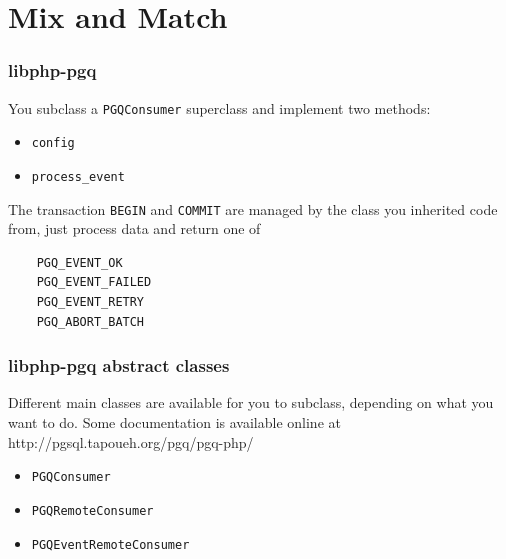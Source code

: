 \documentclass{beamer}
\begin{document}
\section{Mix and Match}


\begin{frame}[fragile]
  \frametitle{libphp-pgq}

  You subclass a \texttt{PGQConsumer} superclass and implement two methods:
  \begin{itemize}
   \item \texttt{config}
   \item \texttt{process\_event}
  \end{itemize}

  \pause

  The transaction \texttt{BEGIN} and \texttt{COMMIT} are managed by the
  class you inherited code from, just process data and return one of

  \begin{verbatim}
    PGQ_EVENT_OK
    PGQ_EVENT_FAILED
    PGQ_EVENT_RETRY
    PGQ_ABORT_BATCH
  \end{verbatim}
\end{frame}

\begin{frame}[fragile]
  \frametitle{libphp-pgq abstract classes}

  Different main classes are available for you to subclass, depending on
  what you want to do. Some documentation is available online at
  http://pgsql.tapoueh.org/pgq/pgq-php/

  \begin{itemize}
   \item<2-> \texttt{PGQConsumer}
   \item<3-> \texttt{PGQRemoteConsumer}
   \item<4-> \texttt{PGQEventRemoteConsumer}
  \end{itemize}
  

\end{frame}
\end{document}
